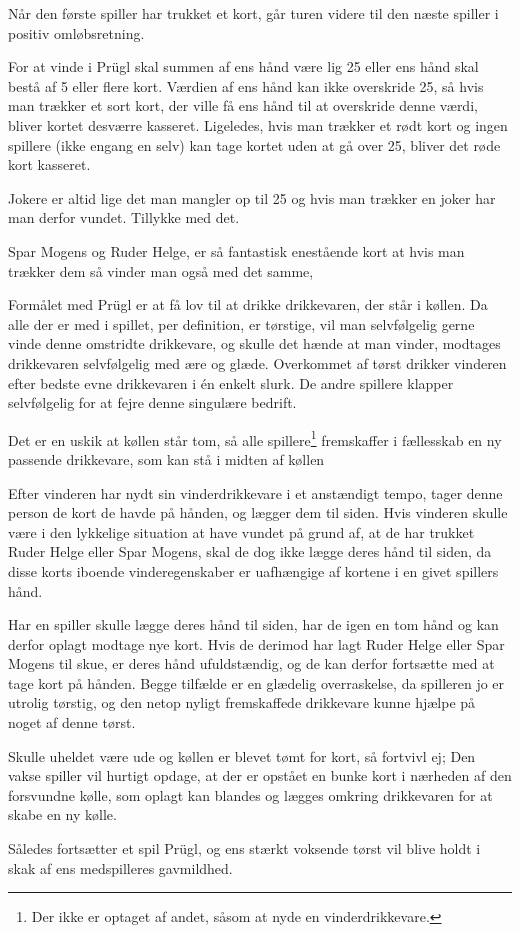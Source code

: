 Når den første spiller har trukket et kort, går turen videre til den næste spiller i positiv omløbsretning.

For at vinde i Prügl skal summen af ens hånd være lig 25 eller ens hånd skal bestå af 5 eller flere kort. Værdien af ens hånd kan ikke overskride 25, så hvis man trækker et sort kort, der ville få ens hånd til at overskride denne værdi, bliver kortet desværre kasseret. Ligeledes, hvis man trækker et rødt kort og ingen spillere (ikke engang en selv) kan tage kortet uden at gå over 25, bliver det røde kort kasseret.

Jokere er altid lige det man mangler op til 25 og hvis man trækker en joker har man derfor vundet. Tillykke med det.

Spar Mogens og Ruder Helge, er så fantastisk enestående kort at hvis man trækker dem så vinder man også med det samme, 

Formålet med Prügl er at få lov til at drikke drikkevaren, der står i køllen. Da alle der er med i spillet, per definition, er tørstige, vil man selvfølgelig gerne vinde denne omstridte drikkevare, og skulle det hænde at man vinder, modtages drikkevaren selvfølgelig med ære og glæde. Overkommet af tørst drikker vinderen efter bedste evne drikkevaren i én enkelt slurk. De andre spillere klapper selvfølgelig for at fejre denne singulære bedrift.

Det er en uskik at køllen står tom, så alle spillere\footnote{Der ikke er optaget af andet, såsom at nyde en vinderdrikkevare.} fremskaffer i fællesskab en ny passende drikkevare, som kan stå i midten af køllen

Efter vinderen har nydt sin vinderdrikkevare i et anstændigt tempo, tager denne person de kort de havde på hånden, og lægger dem til siden. Hvis vinderen skulle være i den lykkelige situation at have vundet på grund af, at de har trukket Ruder Helge eller Spar Mogens, skal de dog ikke lægge deres hånd til siden, da disse korts iboende vinderegenskaber er uafhængige af kortene i en givet spillers hånd.

Har en spiller skulle lægge deres hånd til siden, har de igen en tom hånd og kan derfor oplagt modtage nye kort. Hvis de derimod har lagt Ruder Helge eller Spar Mogens til skue, er deres hånd ufuldstændig, og de kan derfor fortsætte med at tage kort på hånden. Begge tilfælde er en glædelig overraskelse, da spilleren jo er utrolig tørstig, og den netop nyligt fremskaffede drikkevare kunne hjælpe på noget af denne tørst.

Skulle uheldet være ude og køllen er blevet tømt for kort, så fortvivl ej; Den vakse spiller vil hurtigt opdage, at der er opstået en bunke kort i nærheden af den forsvundne kølle, som oplagt kan blandes og lægges omkring drikkevaren for at skabe en ny kølle.

Således fortsætter et spil Prügl, og ens stærkt voksende tørst vil blive holdt i skak af ens medspilleres gavmildhed.

\newpage